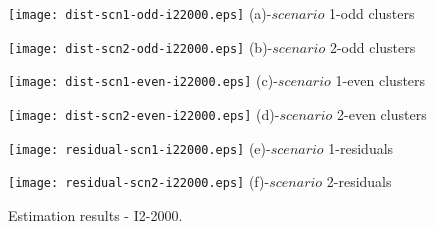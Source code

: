 \begin{figure}
     \begin{minipage}[h]{0.5\linewidth}
        \centering
        \texttt{[image: dist-scn1-odd-i22000.eps]}
				\footnotesize{(a)-$scenario$ 1-odd clusters}
     \end{minipage}
\vspace{3.00mm}
    \begin{minipage}[h]{0.5\linewidth}
       \centering
       \texttt{[image: dist-scn2-odd-i22000.eps]}
			\footnotesize{(b)-$scenario$ 2-odd clusters}
     \end{minipage}
\vspace{3.00mm}
    \begin{minipage}[h]{0.5\linewidth}
       \centering
       \texttt{[image: dist-scn1-even-i22000.eps]}
			\footnotesize{(c)-$scenario$ 1-even clusters}
     \end{minipage}
\vspace{3.00mm}
    \begin{minipage}[h]{0.5\linewidth}
       \centering
       \texttt{[image: dist-scn2-even-i22000.eps]}
			\footnotesize{(d)-$scenario$ 2-even clusters}
     \end{minipage}
\vspace{3.00mm}
    \begin{minipage}[h]{0.5\linewidth}
       \centering
       \texttt{[image: residual-scn1-i22000.eps]}
			\footnotesize{(e)-$scenario$ 1-residuals}
     \end{minipage}
\vspace{3.00mm}
    \begin{minipage}[h]{0.5\linewidth}
       \centering
       \texttt{[image: residual-scn2-i22000.eps]}
			\footnotesize{(f)-$scenario$ 2-residuals}
     \end{minipage}
		\caption{Estimation results - I2-2000.}
\label{fig7}
\end{figure}

